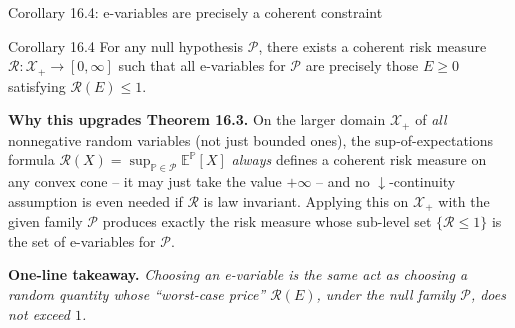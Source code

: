 \documentclass[aspectratio=169,10pt]{beamer}
\newcommand{\PP}{\mathbb{P}}
\newcommand{\EE}{\mathbb{E}}
\newcommand{\1}{\mathbb{1}}
\begin{document}
\begin{frame}{Corollary 16.4: e-variables are precisely a coherent constraint}

\begin{block}{Corollary 16.4}
For any null hypothesis $\mathcal P$, there exists a coherent risk measure $\mathcal R: \mathcal X_+ \to [0,\infty]$ such that all e-variables for $\mathcal P$ are precisely those $E \ge 0$ satisfying $\mathcal R(E) \le 1$.
\end{block}

\textbf{Why this upgrades Theorem 16.3.} On the larger domain $\mathcal X_+$ of \emph{all} nonnegative random variables (not just bounded ones), the sup-of-expectations formula $\mathcal R(X)=\sup_{\PP\in\mathcal P}\EE^{\PP}[X]$ \emph{always} defines a coherent risk measure on any convex cone -- it may just take the value $+\infty$ -- and no $\downarrow$-continuity assumption is even needed if $\mathcal R$ is law invariant. Applying this on $\mathcal X_+$ with the given family $\mathcal P$ produces exactly the risk measure whose sub-level set $\{\mathcal R \le 1\}$ is the set of e-variables for $\mathcal P$.

\vspace{2mm}
\textbf{One-line takeaway.} \emph{Choosing an e-variable is the same act as choosing a random quantity whose ``worst-case price'' $\mathcal R(E)$, under the null family $\mathcal P$, does not exceed $1$.}

\end{frame}
\end{document}
